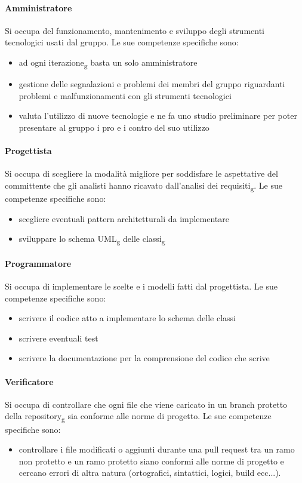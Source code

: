 \paragraph{Amministratore}
Si occupa del funzionamento, mantenimento e sviluppo degli strumenti tecnologici usati dal gruppo. Le sue competenze specifiche sono:
\begin{itemize}
	\item ad ogni iterazione\textsubscript{g} basta un solo amministratore
	\item gestione delle segnalazioni e problemi dei membri del gruppo riguardanti problemi e malfunzionamenti con gli strumenti tecnologici
	\item valuta l'utilizzo di nuove tecnologie e ne fa uno studio preliminare per poter presentare al gruppo i pro e i contro del suo utilizzo
\end{itemize}

\paragraph{Progettista}
Si occupa di scegliere la modalità migliore per soddisfare le aspettative del committente che gli analisti hanno ricavato dall'analisi dei requisiti\textsubscript{g}. Le sue competenze specifiche sono:
\begin{itemize}
	\item scegliere eventuali pattern architetturali da implementare
	\item sviluppare lo schema UML\textsubscript{g} delle classi\textsubscript{g}
\end{itemize}

\paragraph{Programmatore}
Si occupa di implementare le scelte e i modelli fatti dal progettista. Le sue competenze specifiche sono:
\begin{itemize}
	\item scrivere il codice atto a implementare lo schema delle classi
	\item scrivere eventuali test
	\item scrivere la documentazione per la comprensione del codice che scrive
\end{itemize}

\paragraph{Verificatore}
Si occupa di controllare che ogni file che viene caricato in un branch protetto della repository\textsubscript{g} sia conforme alle norme di progetto. Le sue competenze specifiche sono:
\begin{itemize}
	\item controllare i file modificati o aggiunti durante una pull request tra un ramo non protetto e un ramo protetto siano conformi alle norme di progetto e cercano errori di altra natura (ortografici, sintattici, logici, build ecc...).
\end{itemize}